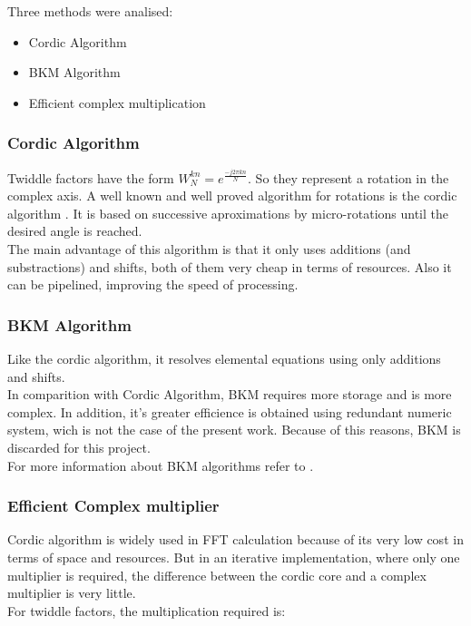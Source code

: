 \documentclass[conference]{IEEEtran}
\begin{document}
Three methods were analised:
\begin{itemize}
  \item Cordic Algorithm
  \item BKM Algorithm
  \item Efficient complex multiplication
\end{itemize}

\subsubsection{Cordic Algorithm}

Twiddle factors have the form $W_N^{kn}=e^{\frac{-j2\pi kn}{N}}$. So they represent a rotation in the complex axis. A well known and well proved 
algorithm for rotations is the cordic algorithm \cite{Volder}. It is based on successive aproximations by micro-rotations until the desired angle is reached.\\
The main advantage of this algorithm is that it only uses additions (and substractions) and shifts, both of them very cheap in terms
of resources. Also it can be pipelined, improving the speed of processing.

\subsubsection{BKM Algorithm}

Like the cordic algorithm, it resolves elemental equations using only additions and shifts.\\
In comparition with Cordic Algorithm, BKM requires more storage and is more complex. In addition, it's greater efficience is obtained using 
redundant numeric system, wich is not the case of the present work. Because of this reasons, BKM is discarded for this project.\\
For more information about BKM algorithms refer to \cite{BKM}.

\subsubsection{Efficient Complex multiplier}

Cordic algorithm is widely used in FFT calculation because of its very low cost in terms of space and resources. But in an iterative 
implementation, where only one multiplier is required, the difference between the cordic core and a complex multiplier is very little.\\
For twiddle factors, the multiplication required is:
\end{document}
